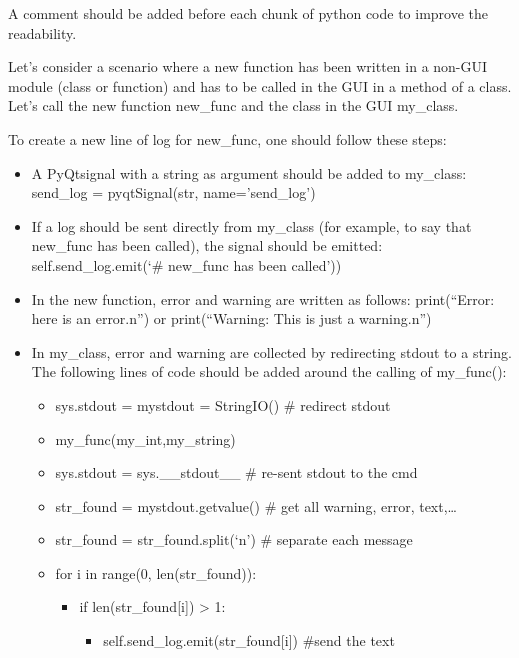 \documentclass[letterpaper,10pt,english]{sphinxmanual}
\begin{document}
A comment should be added before each chunk of python code to improve the readability.


Let’s consider a scenario where a new function has been written in a non-GUI module (class or
function) and has to be called in the GUI in a method of a class. Let’s call the new function
new\_func and the class in the GUI my\_class.

To create a new line of log for new\_func, one should follow these steps:
\begin{itemize}
\item {} 
A PyQtsignal with a string as argument should be added to my\_class: send\_log = pyqtSignal(str, name='send\_log')

\item {} 
If a log should be sent directly from my\_class (for example, to say that new\_func  has been called), the signal should be emitted: self.send\_log.emit(`\# new\_func has been called'))

\item {} 
In the new function,  error and warning are written as follows: print(“Error: here is an error.n”) or print(“Warning:  This is just a warning.n”)

\item {} 
In my\_class, error and warning are collected by redirecting stdout to a string. The following lines of code should be added around the calling of my\_func():
\begin{itemize}
\item {} 
sys.stdout = mystdout = StringIO()  \# redirect stdout

\item {} 
my\_func(my\_int,my\_string)

\item {} 
sys.stdout = sys.\_\_stdout\_\_   \# re-sent stdout to the cmd

\item {} 
str\_found = mystdout.getvalue()   \# get all warning, error, text,…

\item {} 
str\_found = str\_found.split(`n')  \# separate each message

\item {} 
for i in range(0, len(str\_found)):
\begin{itemize}
\item {} 
if len(str\_found{[}i{]}) \textgreater{} 1:
\begin{itemize}
\item {} 
self.send\_log.emit(str\_found{[}i{]})  \#send the text


\end{itemize}
\end{itemize}
\end{itemize}
\end{itemize}
\end{document}
